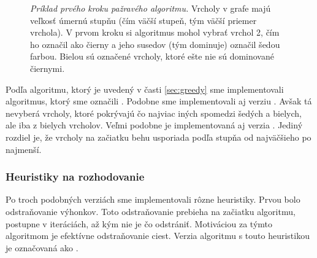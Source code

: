 \begin{figure}
	\centering
	\caption{\emph{Príklad prvého kroku pažravého algoritmu.} 
	Vrcholy v grafe majú veľkosť úmernú stupňu (čím väčší stupeň, tým väčší 
	priemer vrchola). V prvom kroku si algoritmus mohol vybrať vrchol 2, čím ho 
	označil ako čierny a jeho susedov (tým dominuje) označil šedou farbou. 
	Bielou sú označené vrcholy, ktoré ešte nie sú dominované čiernymi.}
	\label{img:imp:colors}
\end{figure}


Podľa algoritmu, ktorý je uvedený v časti \ref{sec:greedy} sme implementovali 
algoritmus, ktorý sme označili . Podobne sme implementovali aj 
verziu . Avšak tá nevyberá vrcholy, ktoré pokrývajú čo najviac 
iných spomedzi šedých a bielych, ale iba z bielych vrcholov. Veľmi podobne je 
implementovaná aj verzia . Jediný rozdiel je, že vrcholy na 
začiatku behu usporiada podľa stupňa od najväčšieho po najmenší.

\subsubsection{Heuristiky na rozhodovanie}

Po troch podobných verziách sme implementovali rôzne heuristiky. Prvou bolo 
odstraňovanie výhonkov. Toto odstraňovanie prebieha na začiatku 
algoritmu, postupne v iteráciách, až kým nie je čo odstrániť. Motiváciou za 
týmto algoritmom je efektívne odstraňovanie ciest. Verzia algoritmu s touto 
heuristikou je označovaná ako . 

